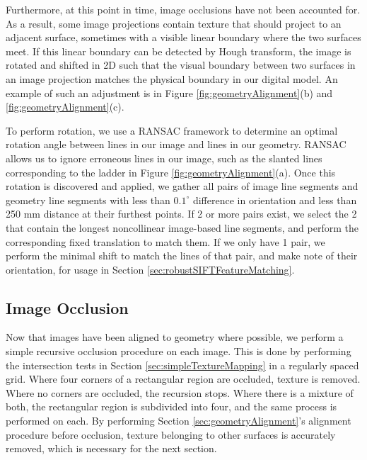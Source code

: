 \documentclass[]{spie}  %
\begin{document}
Furthermore, at this point in time, image occlusions have not been
accounted for. As a result, some image projections contain texture
that should project to an adjacent surface, sometimes with a visible
linear boundary where the two surfaces meet. If this linear boundary
can be detected by Hough transform, the image is rotated and shifted
in 2D such that the visual boundary between two surfaces in an image
projection matches the physical boundary in our digital model. An
example of such an adjustment is in Figure
\ref{fig:geometryAlignment}(b) and \ref{fig:geometryAlignment}(c).

To perform rotation, we use a RANSAC \cite{fischler1981random}
framework to determine an optimal rotation angle between lines in our
image and lines in our geometry. RANSAC allows us to ignore erroneous
lines in our image, such as the slanted lines corresponding to the
ladder in Figure \ref{fig:geometryAlignment}(a). Once this rotation is
discovered and applied, we gather all pairs of image line segments and
geometry line segments with less than $0.1^\circ$ difference in
orientation and less than 250 mm distance at their furthest points. If
2 or more pairs exist, we select the 2 that contain the longest
noncollinear image-based line segments, and perform the corresponding
fixed translation to match them. If we only have 1 pair, we perform
the minimal shift to match the lines of that pair, and make note of
their orientation, for usage in Section
\ref{sec:robustSIFTFeatureMatching}.


\subsection{Image Occlusion}
\label{sec:imageOcclusion}
Now that images have been aligned to geometry where possible, we
perform a simple recursive occlusion procedure on each image. This is
done by performing the intersection tests in Section
\ref{sec:simpleTextureMapping} in a regularly spaced grid. Where four
corners of a rectangular region are occluded, texture is
removed. Where no corners are occluded, the recursion stops. Where
there is a mixture of both, the rectangular region is subdivided into
four, and the same process is performed on each. By performing Section
\ref{sec:geometryAlignment}'s alignment procedure before occlusion,
texture belonging to other surfaces is accurately removed, which is
necessary for the next section.
\end{document}
